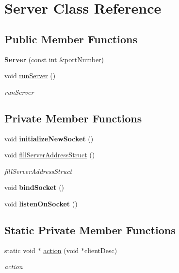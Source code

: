 \hypertarget{classServer}{}\section{Server Class Reference}
\label{classServer}
\subsection*{Public Member Functions}
\begin{DoxyCompactItemize}
\item 
\mbox{\label{classServer_a1a3d683f763e9a89a8f3a001404332e0}} 
{\bfseries Server} (const int \&port\+Number)
\item 
void \hyperlink{classServer_a5dfdd750d32aa4adbb4fdd8ba29b1224}{run\+Server} ()
\begin{DoxyCompactList}\small\item\em run\+Server \end{DoxyCompactList}\end{DoxyCompactItemize}
\subsection*{Private Member Functions}
\begin{DoxyCompactItemize}
\item 
\mbox{\label{classServer_ac47f99e1f4ab05e3d67b213514caf748}} 
void {\bfseries initialize\+New\+Socket} ()
\item 
void \hyperlink{classServer_a684bf0fce1ec62711a60d0cc3d25e8f8}{fill\+Server\+Address\+Struct} ()
\begin{DoxyCompactList}\small\item\em fill\+Server\+Address\+Struct \end{DoxyCompactList}\item 
\mbox{\label{classServer_a8d86edf1df9f12df07dc6e949d70f77f}} 
void {\bfseries bind\+Socket} ()
\item 
\mbox{\label{classServer_ab021d8bdec2e65ef97537b9542e946a2}} 
void {\bfseries listen\+On\+Socket} ()
\end{DoxyCompactItemize}
\subsection*{Static Private Member Functions}
\begin{DoxyCompactItemize}
\item 
static void $\ast$ \hyperlink{classServer_a75b8fdcfd5e0438efe7bb79b317caa16}{action} (void $\ast$client\+Desc)
\begin{DoxyCompactList}\small\item\em action \end{DoxyCompactList}\end{DoxyCompactItemize}
